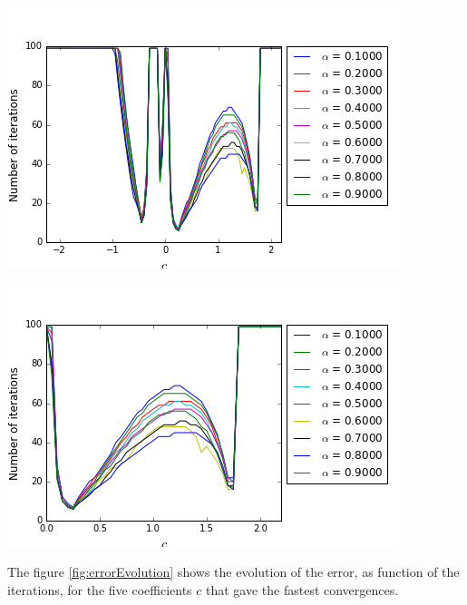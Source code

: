 \begingroup
\begin{minipage}{.5\linewidth}
\begin{center}
	\includegraphics[scale=.4]{figures/NiterxCoefVarInterfaceNegativeCoefCorrectN.png}
\end{center}
\end{minipage}
\begin{minipage}{.5\linewidth}
\begin{center}
	\includegraphics[scale=.4]{figures/NiterxCoefVarInterfaceCorrectN.png}
\end{center}
\end{minipage}
\endgroup

\indent The figure \ref{fig:errorEvolution} shows the evolution of the error, as function of the iterations, for the five coefficients $c$ that gave the fastest convergences. 

